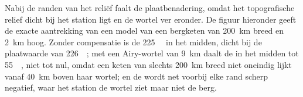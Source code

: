 Nabij de randen van het reliëf faalt de plaatbenadering, omdat het topografische relief dicht bij het station ligt en de wortel ver eronder. De figuur hieronder geeft de exacte aantrekking van een model van een bergketen van \qty{200}{km} breed en \qty{2}{km} hoog. Zonder compensatie is de  \qty{+225}{\milli\gal} in het midden, dicht bij de plaatwaarde van \qty{226}{\milli\gal}; met een Airy-wortel van \qty{9}{km} daalt de  in het midden tot \qty{+55}{\milli\gal}, niet tot nul, omdat een keten van slechts \qty{200}{km} breed niet oneindig lijkt vanaf \qty{40}{km} boven haar wortel; en de  wordt net voorbij elke rand scherp negatief, waar het station de wortel ziet maar niet de berg.

